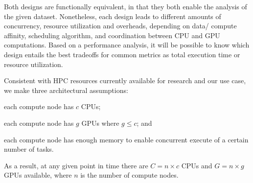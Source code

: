 Both designs are functionally equivalent, in that they both enable the 
analysis of the given dataset. Nonetheless, each design leads to different 
amounts of concurrency, resource utilization and overheads, depending on data/
compute affinity, scheduling algorithm, and coordination between CPU and GPU 
computations. Based on a performance analysis, it will be possible to know 
which design entails the best tradeoffs for common metrics as total execution 
time or resource utilization.

Consistent with HPC resources currently available for research and our use 
case, we make three architectural assumptions: 
\begin{inparaenum}[(1)]
    \item each compute node has $c$ CPUs;
    \item each compute node has $g$ GPUs where $g \le c$; and
    \item each compute node has enough memory to enable concurrent execute of 
    a certain number of tasks.
\end{inparaenum}
As a result, at any given point in time there are $C = n\times c$ CPUs and 
$G = n\times g$ GPUs available, where $n$ is the number of compute nodes.


